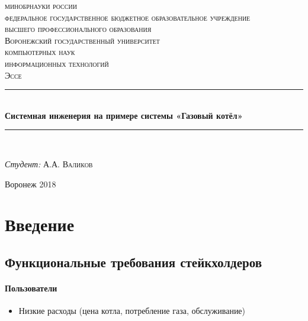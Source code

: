 \documentclass[bibliography=totocnumbered]{scrartcl}
\begin{document}
\begin{titlepage}
\newcommand{\HRule}{\rule{\linewidth}{0.5mm}}
\center
\textsc {
\footnotesize{
минобрнауки россии\\
федеральное государственное бюджетное образовательное учреждение\\
высшего профессионального образования}\\
\large{Воронежский государственный университет}
}\\[1.0cm]
\textsc{ компьютерных наук}\\
\textsc{ информационных технологий}\\[1.0cm] 
\textsc{\Large Эссе}\\[0.5cm]
\HRule \\[0.4cm]
{ \huge \bfseries Системная инженерия на примере системы «Газовый котёл»}\\[0.4cm] %
\HRule \\[1.5cm]


\begin{flushleft} \large
\emph{Студент:} А.А. \textsc{Валиков} \\
\end{flushleft}

\vfill
\begin{center}
Воронеж 2018
\end{center}
\end{titlepage}

\tableofcontents

\newpage

\section{Введение}

\subsection{Функциональные требования стейкхолдеров}

\paragraph{Пользователи}
\begin{itemize}
  \item Низкие расходы (цена котла, потребление газа, обслуживание)
\end{itemize}
\end{document}
